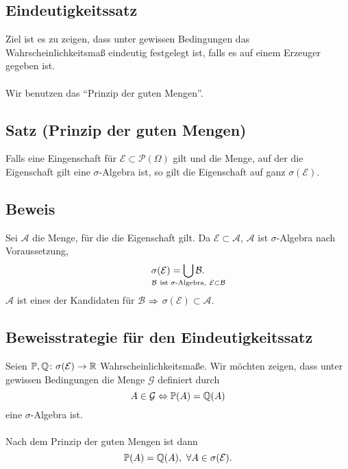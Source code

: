 \subsection{Eindeutigkeitssatz}
Ziel ist es zu zeigen, dass unter gewissen Bedingungen das Wahrscheinlichkeitsma\ss{} eindeutig festgelegt ist, falls es auf einem Erzeuger gegeben ist.
\\~\\
Wir benutzen das ``Prinzip der guten Mengen''.
\subsection{Satz (Prinzip der guten Mengen)}
Falls eine Eingenschaft f\"ur $\mathcal{E}\subset\mathcal{P}(\Omega)$ gilt und die Menge, auf der die Eigenschaft gilt eine $\sigma$-Algebra ist, so gilt die Eigenschaft auf ganz $\sigma(\mathcal{E})$.
\subsection{Beweis}
Sei $\mathcal{A}$ die Menge, f\"ur die die Eigenschaft gilt. Da $\mathcal{E}\subset\mathcal{A}$, $\mathcal{A}$ ist $\sigma$-Algebra nach Voraussetzung,
\[\sigma(\mathcal{E})=\bigcup_{\mathclap{\mathcal{B}\ \text{ist $\sigma$-Algebra},\ \mathcal{E}\subset\mathcal{B}}}\mathcal{B}.\]
$\mathcal{A}$ ist eines der Kandidaten f\"ur $\mathcal{B}$ $\Rightarrow$ $\sigma(\mathcal{E})\subset\mathcal{A}$.
\subsection{Beweisstrategie f\"ur den Eindeutigkeitssatz}
Seien $\mathbb{P},\mathbb{Q}\colon\sigma(\mathcal{E})\to\mathbb{R}$ Wahrscheinlichkeitsma\ss{}e. Wir m\"ochten zeigen, dass unter gewissen Bedingungen die Menge $\mathcal{G}$ definiert durch
\[A\in\mathcal{G}\Leftrightarrow\mathbb{P}(A)=\mathbb{Q}(A)\]
eine $\sigma$-Algebra ist.
\\~\\
Nach dem Prinzip der guten Mengen ist dann
\[\mathbb{P}(A)=\mathbb{Q}(A),\ \forall A\in\sigma(\mathcal{E}).\]
